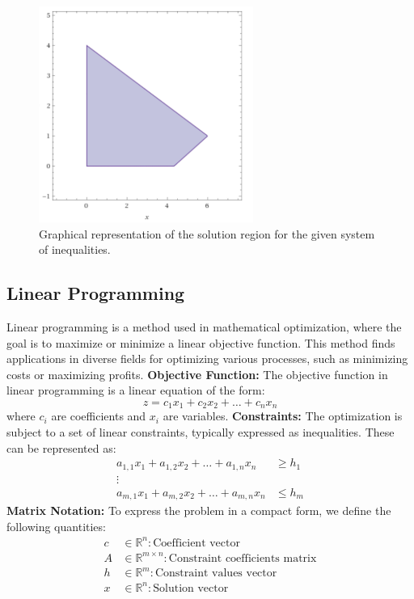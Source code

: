 \documentclass[unicode,11pt,a4paper,oneside,numbers=endperiod,openany]{scrartcl}
\begin{document}
\begin{figure}[H]
    \centering
    \includegraphics[trim=0cm 0cm 0cm 0cm, clip, width=7cm]{img11.png}
    \caption{Graphical representation of the solution region for the given system of inequalities.}
    \label{fig:img11}
\end{figure}


\subsection{Linear Programming}
Linear programming is a method used in mathematical optimization, where the goal is to maximize or minimize a linear objective function. This method finds applications in diverse fields for optimizing various processes, such as minimizing costs or maximizing profits.
\newline
\textbf{Objective Function:}
The objective function in linear programming is a linear equation of the form:
\[
 z = c_1x_1 + c_2x_2 + \ldots + c_nx_n
\]
where \( c_i \) are coefficients and \( x_i \) are variables.
\newline
\textbf{Constraints:}
The optimization is subject to a set of linear constraints, typically expressed as inequalities. These can be represented as:
\[
 \begin{aligned}
 a_{1,1}x_1 + a_{1,2}x_2 + \ldots + a_{1,n}x_n &\geq h_1 \\
 \vdots \\
 a_{m,1}x_1 + a_{m,2}x_2 + \ldots + a_{m,n}x_n &\leq h_m
 \end{aligned}
\]
\newline
\textbf{Matrix Notation:}
To express the problem in a compact form, we define the following quantities:
\[
 \begin{aligned}
 c &\in \mathbb{R}^n: \text{Coefficient vector} \\
 A &\in \mathbb{R}^{m \times n}: \text{Constraint coefficients matrix} \\
 h &\in \mathbb{R}^m: \text{Constraint values vector} \\
 x &\in \mathbb{R}^n: \text{Solution vector}
 \end{aligned}
\]
\end{document}
